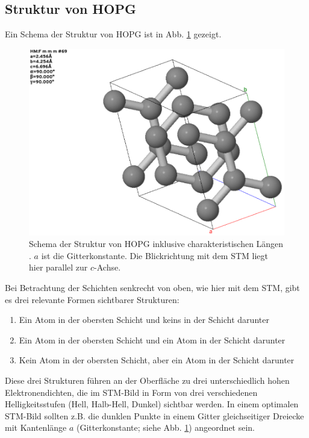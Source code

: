 \documentclass{article}
\begin{document}
\subsection{Struktur von HOPG}
Ein Schema der Struktur von HOPG ist in Abb. \ref{fig:hopg-structure} gezeigt.
\begin{figure}[h]
    \centering
    \includegraphics[width=0.5\linewidth]{hopg-structure}
    \caption{
        Schema der Struktur von HOPG inklusive charakteristischen Längen \cite{graphite}. $a$ ist die Gitterkonstante.
        Die Blickrichtung mit dem STM liegt hier parallel zur $c$-Achse.
    }
    \label{fig:hopg-structure}
\end{figure}
Bei Betrachtung der Schichten senkrecht von oben, wie hier mit dem STM, gibt es drei relevante Formen sichtbarer Strukturen:
\begin{enumerate}
  \item Ein Atom in der obersten Schicht und keins in der Schicht darunter
  \item Ein Atom in der obersten Schicht und ein Atom in der Schicht darunter
  \item Kein Atom in der obersten Schicht, aber ein Atom in der Schicht darunter
\end{enumerate}
Diese drei Strukturen führen an der Oberfläche zu drei unterschiedlich hohen Elektronendichten,
die im STM-Bild in Form von drei verschiedenen Helligkeitsstufen (Hell, Halb-Hell, Dunkel) sichtbar werden.
In einem optimalen STM-Bild sollten z.B. die dunklen Punkte in
einem Gitter gleichseitiger Dreiecke mit Kantenlänge $a$ (Gitterkonstante; siehe Abb. \ref{fig:hopg-structure}) angeordnet sein.
\end{document}

